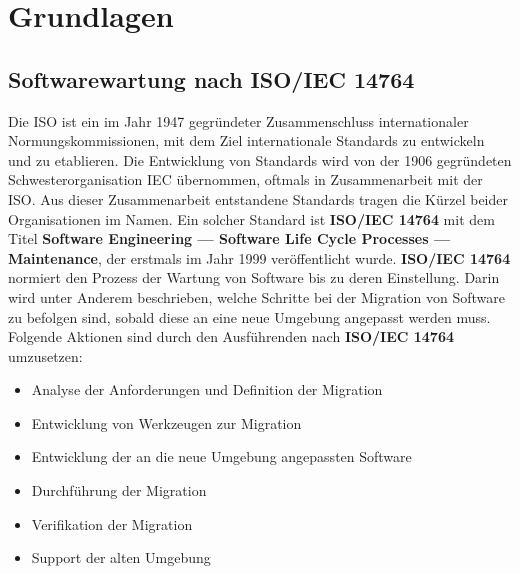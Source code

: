 \chapter{Grundlagen}\label{ch:grundlagen}

\section{Softwarewartung nach ISO/IEC 14764}
Die \ac{ISO} ist ein im Jahr 1947 gegründeter Zusammenschluss internationaler Normungskommissionen, mit dem Ziel internationale Standards zu entwickeln und zu etablieren.\cite{international_organization_for_standardization:_about_nodate}
Die Entwicklung von Standards wird von der 1906 gegründeten Schwesterorganisation \ac{IEC} übernommen, oftmals in Zusammenarbeit mit der \ac{ISO}.\cite{international_electrotechnical_commission_iec_nodate}
Aus dieser Zusammenarbeit entstandene Standards tragen die Kürzel beider Organisationen im Namen. Ein solcher Standard ist \textbf{ISO/IEC 14764} mit dem Titel
\textbf{Software Engineering — Software Life Cycle Processes — Maintenance}, der erstmals im Jahr 1999 veröffentlicht wurde.
\textbf{ISO/IEC 14764} normiert den Prozess der Wartung von Software bis zu deren Einstellung.
Darin wird unter Anderem beschrieben, welche Schritte bei der Migration von Software zu befolgen sind, sobald diese an eine neue Umgebung angepasst werden muss.
Folgende Aktionen sind durch den Ausführenden nach \textbf{ISO/IEC 14764} umzusetzen:
\begin{itemize}
    \item Analyse der Anforderungen und Definition der Migration
    \item Entwicklung von Werkzeugen zur Migration
    \item Entwicklung der an die neue Umgebung angepassten Software
    \item Durchführung der Migration
    \item Verifikation der Migration
    \item Support der alten Umgebung
\end{itemize}

